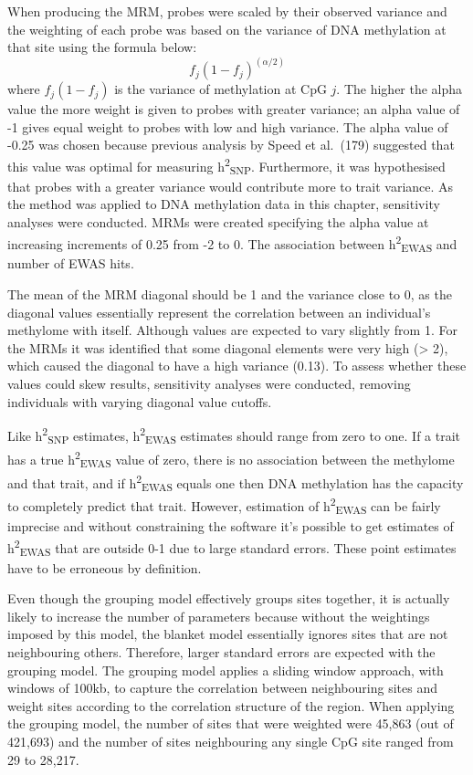 \documentclass[11pt,oneside]{bristolthesis}
\begin{document}
When producing the MRM, probes were scaled by their observed variance and the weighting of each probe was based on the variance of DNA methylation at that site using the formula below:
\begin{equation}
    f_{j}(1-f_{j})^{(\alpha/2)}
    \label{eq:mrm-weights}
\end{equation}
where \(f_j(1-f_j)\) is the variance of methylation at CpG \(j\). The higher the alpha value the more weight is given to probes with greater variance; an alpha value of -1 gives equal weight to probes with low and high variance. The alpha value of -0.25 was chosen because previous analysis by Speed et al.~(179) suggested that this value was optimal for measuring h\textsuperscript{2}\textsubscript{SNP}. Furthermore, it was hypothesised that probes with a greater variance would contribute more to trait variance. As the method was applied to DNA methylation data in this chapter, sensitivity analyses were conducted. MRMs were created specifying the alpha value at increasing increments of 0.25 from -2 to 0. The association between h\textsuperscript{2}\textsubscript{EWAS} and number of EWAS hits.

The mean of the MRM diagonal should be 1 and the variance close to 0, as the diagonal values essentially represent the correlation between an individual's methylome with itself. Although values are expected to vary slightly from 1. For the MRMs it was identified that some diagonal elements were very high (\textgreater{} 2), which caused the diagonal to have a high variance (0.13). To assess whether these values could skew results, sensitivity analyses were conducted, removing individuals with varying diagonal value cutoffs.

Like h\textsuperscript{2}\textsubscript{SNP} estimates, h\textsuperscript{2}\textsubscript{EWAS} estimates should range from zero to one. If a trait has a true h\textsuperscript{2}\textsubscript{EWAS} value of zero, there is no association between the methylome and that trait, and if h\textsuperscript{2}\textsubscript{EWAS} equals one then DNA methylation has the capacity to completely predict that trait. However, estimation of h\textsuperscript{2}\textsubscript{EWAS} can be fairly imprecise and without constraining the software it's possible to get estimates of h\textsuperscript{2}\textsubscript{EWAS} that are outside 0-1 due to large standard errors. These point estimates have to be erroneous by definition.

Even though the grouping model effectively groups sites together, it is actually likely to increase the number of parameters because without the weightings imposed by this model, the blanket model essentially ignores sites that are not neighbouring others. Therefore, larger standard errors are expected with the grouping model. The grouping model applies a sliding window approach, with windows of 100kb, to capture the correlation between neighbouring sites and weight sites according to the correlation structure of the region. When applying the grouping model, the number of sites that were weighted were 45,863 (out of 421,693) and the number of sites neighbouring any single CpG site ranged from 29 to 28,217.
\end{document}
